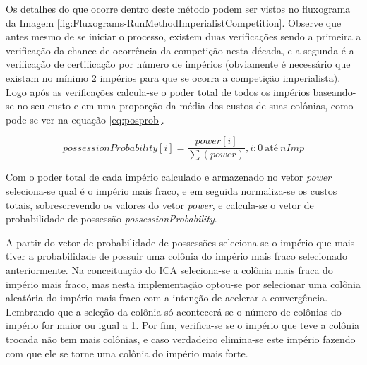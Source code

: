 Os detalhes do que ocorre dentro deste método podem ser vistos no fluxograma da Imagem \ref{fig:Fluxograms-RunMethodImperialistCompetition}. Observe que antes mesmo de se iniciar o processo, existem duas verificações sendo a primeira a verificação da chance de ocorrência da competição nesta década, e a segunda é a verificação de certificação por número de impérios (obviamente é necessário que existam no mínimo 2 impérios para que se ocorra a competição imperialista). Logo após as verificações calcula-se o poder total de todos os impérios baseando-se no seu custo e em uma proporção da média dos custos de suas colônias, como pode-se ver na equação \ref{eq:posprob}.

\begin{equation}
\label{eq:posprob}
possessionProbability[i] = \frac{power[i]}{ \sum(power)}, i : 0 \ \textrm{até} \ nImp
\end{equation}


Com o poder total de cada império calculado e armazenado no vetor \emph{power} seleciona-se qual é o império mais fraco, e em seguida normaliza-se os custos totais, sobrescrevendo os valores do vetor \emph{power}, e calcula-se o vetor de probabilidade de possessão \emph{possessionProbability}.

A partir do vetor de probabilidade de possessões seleciona-se o império que mais tiver a probabilidade de possuir uma colônia do império mais fraco selecionado anteriormente. Na conceituação do ICA seleciona-se a colônia mais fraca do império mais fraco, mas nesta implementação optou-se por selecionar uma colônia aleatória do império mais fraco com a intenção de acelerar a convergência. Lembrando que a seleção da colônia só acontecerá se o número de colônias do império for maior ou igual a 1. Por fim, verifica-se se o império que teve a colônia trocada não tem mais colônias, e caso verdadeiro elimina-se este império fazendo com que ele se torne uma colônia do império mais forte.
    
